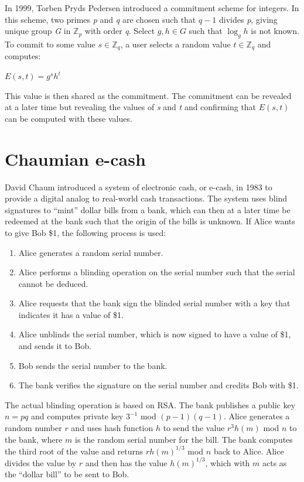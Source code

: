 \documentclass[11pt]{article}
\begin{document}
In 1999, Torben Pryds Pedersen introduced a commitment scheme for integers.\cite{pedersen} In this scheme, two primes
\emph{p} and \emph{q} are chosen such that $q-1$ divides \emph{p}, giving unique group \emph{G} in $\mathbb{Z}_p$ with
order \emph{q}. Select $g, h \in G$ such that $\log_g h$ is not known. To commit to some value $s \in \mathbb{Z}_q$, a
user selects a random value $t \in \mathbb{Z}_q$ and computes:
\begin{center}
    $E(s,t) = g^sh^t$
\end{center}

This value is then shared as the commitment. The commitment can be revealed at a later time but revealing the values of
\emph{s} and \emph{t} and confirming that $E(s,t)$ can be computed with these values.

\section{Chaumian e-cash}
David Chaum introduced a system of electronic cash, or e-cash, in 1983 to provide a digital analog to real-world cash
transactions. The system uses blind signatures to ``mint'' dollar bills from a bank, which can then at a later time be
redeemed at the bank such that the origin of the bills is unknown.\cite{chaum83} If Alice wants to give Bob \$1, the
following process is used:
\begin{enumerate}
    \item Alice generates a random serial number.
    \item Alice performs a blinding operation on the serial number such that the serial cannot be deduced.
    \item Alice requests that the bank sign the blinded serial number with a key that indicates it has a value of \$1.
    \item Alice unblinds the serial number, which is now signed to have a value of \$1, and sends it to Bob.
    \item Bob sends the serial number to the bank.
    \item The bank verifies the signature on the serial number and credits Bob with \$1.
\end{enumerate}

The actual blinding operation is based on RSA. The bank publishes a public key $n=pq$ and computes private key
$3^{-1}$ mod $(p-1)(q-1)$. Alice generates a random number $r$ and uses hash function $h$ to send the value
$r^3h(m)$ mod $n$ to the bank, where $m$ is the random serial number for the bill. The bank computes the third
root of the value and returns $rh(m)^{1/3}$ mod $n$ back to Alice. Alice divides the value by $r$ and then has
the value $h(m)^{1/3}$, which with $m$ acts as the ``dollar bill'' to be sent to Bob.
\end{document}
